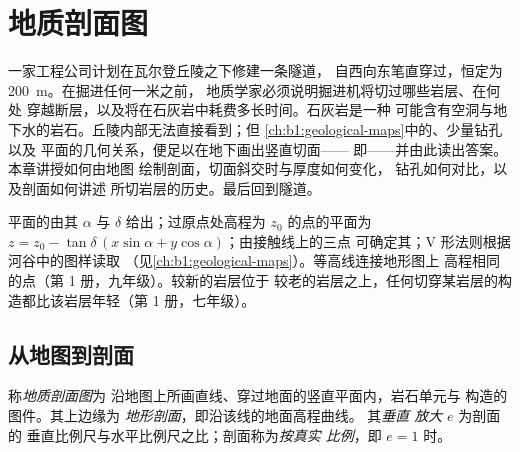 \chapter{地质剖面图}\label{ch:b1:cross-sections}

一家工程公司计划在瓦尔登丘陵之下修建一条隧道，
自西向东笔直穿过，恒定为 \qty{200}{m}。在掘进任何一米之前，
地质学家必须说明掘进机将切过哪些岩层、在何处
穿越断层，以及将在石灰岩中耗费多长时间。石灰岩是一种
可能含有空洞与地下水的岩石。丘陵内部无法直接看到；但
\cref{ch:b1:geological-maps}中的、少量钻孔以及
平面的几何关系，便足以在地下画出竖直切面——
即——并由此读出答案。本章讲授如何由地图
绘制剖面，切面斜交时与厚度如何变化，
钻孔如何对比，以及剖面如何讲述
所切岩层的历史。最后回到隧道。

\begin{recall}
平面的由其 $\alpha$ 与
$\delta$ 给出；过原点处高程为 $z_0$ 的点的平面为
$z = z_0 - \tan\delta\,(x\sin\alpha + y\cos\alpha)$；由接触线上的三点
可确定其；V 形法则根据河谷中的图样读取
（见\cref{ch:b1:geological-maps}）。等高线连接地形图上
高程相同的点（第 1 册，九年级）。较新的岩层位于
较老的岩层之上，任何切穿某岩层的构造都比该岩层年轻（第 1 册，七年级）。
\end{recall}

\section{从地图到剖面}

\begin{definition}\label{def:b1:cross-sections:section}
称\emph{地质剖面图}为
沿地图上所画直线、穿过地面的竖直平面内，岩石单元与
构造的图件。其上边缘为
\emph{地形剖面}，即沿该线的地面高程曲线。
其\emph{垂直
放大} $e$ 为剖面的
垂直比例尺与水平比例尺之比；剖面称为\emph{按真实
比例}，即 $e = 1$ 时。
\end{definition}

